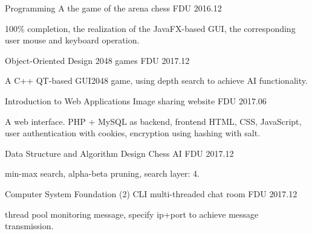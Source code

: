 

\begin{cventries}

  \cventry
    {Programming A}
    {the game of the arena chess}
    {FDU}
    {2016.12}
    {
      \begin{cvitems} %
      \item {100\% completion, the realization of the JavaFX-based GUI, the corresponding user mouse and keyboard operation.}
      \end{cvitems}
    }

  \cventry
    {Object-Oriented Design}
    {2048 games}
    {FDU}
    {2017.12}
    {
      \begin{cvitems} %
      \item {A C++ QT-based GUI2048 game, using depth search to achieve AI functionality.}
      \end{cvitems}
    }

  \cventry
    {Introduction to Web Applications}
    {Image sharing website}
    {FDU}
    {2017.06}
    {
      \begin{cvitems} %
      \item {A web interface. PHP + MySQL as backend, frontend HTML, CSS, JavaScript, user authentication with cookies, encryption using hashing with salt.}
      \end{cvitems}
    }

  \cventry
    {Data Structure and Algorithm Design}
    {Chess AI}
    {FDU}
    {2017.12}
    {
      \begin{cvitems} %
      \item {min-max search, alpha-beta pruning, search layer: 4.}
      \end{cvitems}
    }

  \cventry
    {Computer System Foundation (2)}
    {CLI multi-threaded chat room}
    {FDU}
    {2017.12}
    {
      \begin{cvitems} %
        \item {thread pool monitoring message, specify ip+port to achieve message transmission.}
      \end{cvitems}
    }


\end{cventries}
